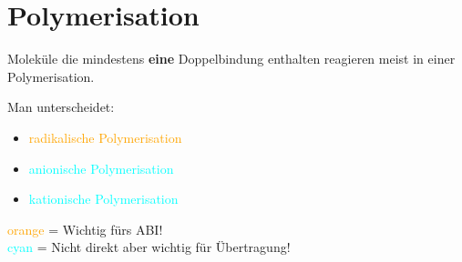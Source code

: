 \section{Polymerisation}
Moleküle die mindestens \textbf{eine} Doppelbindung enthalten reagieren meist in einer Polymerisation.

Man unterscheidet: 
\begin{itemize}
    \item \textcolor{orange}{radikalische Polymerisation}
    \item \textcolor{cyan}{anionische Polymerisation}
    \item \textcolor{cyan}{kationische Polymerisation}
\end{itemize}

\textcolor{orange}{orange} = Wichtig fürs ABI! \\
\textcolor{cyan}{cyan} = Nicht direkt aber wichtig für Übertragung!
